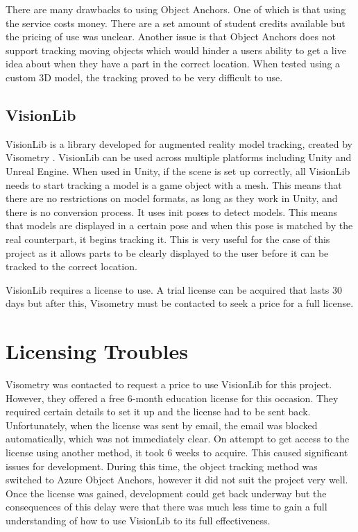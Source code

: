 \documentclass{l4proj}
\begin{document}
There are many drawbacks to using Object Anchors. One of which is that using the service costs money. There are a set amount of student credits available but the pricing of use was unclear. Another issue is that Object Anchors does not support tracking moving objects which would hinder a users ability to get a live idea about when they have a part in the correct location. When tested using a custom 3D model, the tracking proved to be very difficult to use.

\subsection{VisionLib}

VisionLib is a library developed for augmented reality model tracking, created by Visometry \citep{visometry_visionlib_nodate}. VisionLib can be used across multiple platforms including Unity and Unreal Engine. When used in Unity, if the scene is set up correctly, all VisionLib needs to start tracking a model is a game object with a mesh. This means that there are no restrictions on model formats, as long as they work in Unity, and there is no conversion process. It uses init poses to detect models. This means that models are displayed in a certain pose and when this pose is matched by the real counterpart, it begins tracking it. This is very useful for the case of this project as it allows parts to be clearly displayed to the user before it can be tracked to the correct location. %

VisionLib requires a license to use. A trial license can be acquired that lasts 30 days but after this, Visometry must be contacted to seek a price for a full license.

\section{Licensing Troubles}
\label{sec:license}

Visometry was contacted to request a price to use VisionLib for this project. However, they offered a free 6-month education license for this occasion. They required certain details to set it up and the license had to be sent back. Unfortunately, when the license was sent by email, the email was blocked automatically, which was not immediately clear. On attempt to get access to the license using another method, it took 6 weeks to acquire. This caused significant issues for development. During this time, the object tracking method was switched to Azure Object Anchors, however it did not suit the project very well. Once the license was gained, development could get back underway but the consequences of this delay were that there was much less time to gain a full understanding of how to use VisionLib to its full effectiveness.
\end{document}
